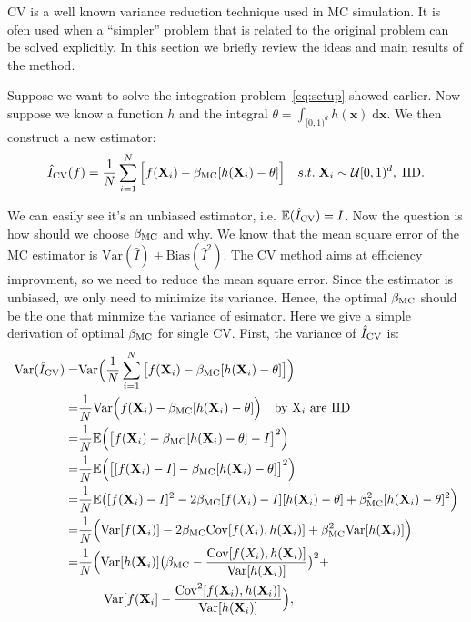 
CV is a well known variance reduction technique used in MC simulation. 
It is ofen used when a ``simpler'' problem that is related to the original problem can be solved explicitly. In this section we briefly review the ideas and main results of the method.
 
Suppose we want to solve the integration problem~\eqref{eq:setup} showed earlier. Now suppose we know a function $h$ and the integral  
$\theta=\int_{[0,1)^d} h(\mathbf{x})\;\textrm{d}\mathbf{x}$. 
We then construct a new estimator:
\[\hat{I}_{\mathrm{CV}}(f)=\frac{1}{N}\sum_{i=1}^{N}\Big[ f(\mathbf{X}_i)-\beta_{\mathrm{MC}}[h(\mathbf{X}_i)-\theta] \Big] \quad s.t.\; \mathbf{X}_i\sim \mathcal{U}[0,1)^d, \;\textrm{IID}.\]

We can easily see it's an unbiased estimator, i.e. $\mathbb{E}(\hat{I}_{\mathrm{CV}}) = I$.
Now the question is how should we choose $\beta_{\mathrm{MC}}$ and why.
We know that the mean square error of the MC estimator is $\mathrm{Var}(\hat{I})+\mathrm{Bias}(\hat{I}^2)$. 
The CV method aims at efficiency improvment, so we need to reduce the mean square error. 
Since the estimator is unbiased, we only need to minimize its variance.
Hence, the optimal $\beta_{\mathrm{MC}}$ should be the one that minmize the variance of esimator.
Here we give a simple derivation of optimal $\beta_{\mathrm{MC}}$ for single CV.
First, the variance of $\hat{I}_{\mathrm{CV}}$ is: 
\begin{align*}
	\mathrm{Var}(\hat{I}_{\mathrm{CV}})
    =&\mathrm{Var}\Big( \frac{1}{N}\sum_{i=1}^{N}\big[ f(\mathbf{X}_i)-\beta_{\mathrm{MC}}[h(\mathbf{X}_i)-\theta] \big]\Big)\\
    =&\frac{1}{N}\mathrm{Var}\Big(f(\mathbf{X}_i)-\beta_{\mathrm{MC}}[h(\mathbf{X}_i)-\theta]\Big)\quad \text{by $\mathrm{X}_i$ are IID} \\
    =&\frac{1}{N}\mathbb{E}\Big(\big[f(\mathbf{X}_i)-\beta_{\mathrm{MC}}[h(\mathbf{X}_i)-\theta]-I\big]^2 \Big) \\
    =&\frac{1}{N}\mathbb{E}\Big(\big[ [f(\mathbf{X}_i)-I] -\beta_{\mathrm{MC}}[h(\mathbf{X}_i)-\theta]\big]^2 \Big) \\
    =&\frac{1}{N}\mathbb{E}\big([f(\mathbf{X}_i)-I]^2-2\beta_{\mathrm{MC}}[f(X_i)-I][h(\mathbf{X}_i)-\theta]+\beta_{\mathrm{MC}}^2[h(\mathbf{X}_i)-\theta]^2 \Big)\\
    =&\frac{1}{N}\Big(\mathrm{Var}[f(\mathbf{X}_i)]-2\beta_{\mathrm{MC}}\mathrm{Cov}[f(X_i),h(\mathbf{X}_i)]+\beta_{\mathrm{MC}}^2\mathrm{Var}[h(\mathbf{X}_i)]\Big)\\
    =&\frac{1}{N}\Big(\mathrm{Var}[h(\mathbf{X}_i)]\big(\beta_{\mathrm{MC}}-\frac{\mathrm{Cov}[f(X_i),h(\mathbf{X}_i)]}{\mathrm{Var}[h(\mathbf{X}_i)]}\big)^2+\\
     &\quad \quad \mathrm{Var}[f(\mathbf{X}_i]-\frac{\mathrm{Cov}^2[f(\mathbf{X}_i),h(\mathbf{X}_i)]}{\mathrm{Var}[h(\mathbf{X}_i)]} \Big),
\end{align*}
